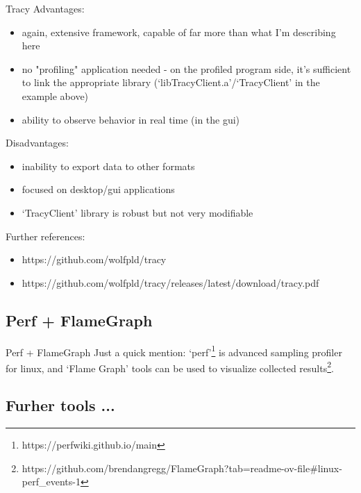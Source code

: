 \documentclass[aspectratio=169]{beamer}
\begin{document}
\begin{frame}{Tracy}
    Advantages:

    \begin{itemize}
        \item again, extensive framework, capable of far more than what I'm describing here
        \item no "profiling" application needed - on the profiled program side, it's sufficient to link the appropriate library (`libTracyClient.a'/`TracyClient' in the example above)
        \item ability to observe behavior in real time (in the gui)
    \end{itemize}

    Disadvantages:

    \begin{itemize}
        \item inability to export data to other formats
        \item focused on desktop/gui applications
        \item `TracyClient' library is robust but not very modifiable
    \end{itemize}

    Further references:

    \begin{itemize}
        \item https://github.com/wolfpld/tracy
        \item https://github.com/wolfpld/tracy/releases/latest/download/tracy.pdf
    \end{itemize}

\end{frame}


\subsection{Perf + FlameGraph}

\begin{frame}{Perf + FlameGraph}
    Just a quick mention: `perf'\footnote{https://perfwiki.github.io/main} is advanced sampling profiler for linux, and `Flame Graph' tools can be used to visualize collected results\footnote{https://github.com/brendangregg/FlameGraph?tab=readme-ov-file\#linux-perf\_events-1}.

\end{frame}


\subsection{Furher tools ...}
\end{document}
